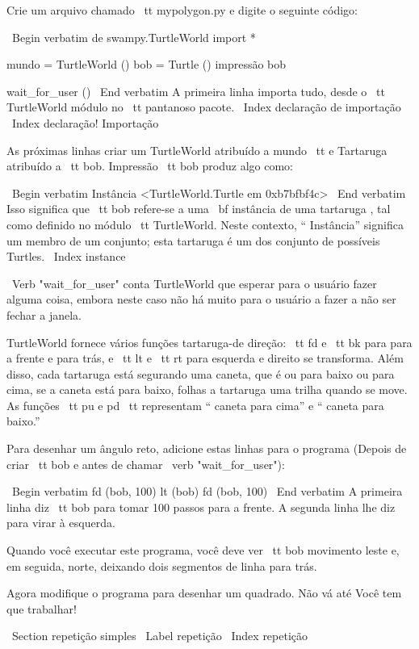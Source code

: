 \documentclass[10pt]{book}
\begin{document}
{Crie um arquivo chamado {\ tt mypolygon.py} e digite o seguinte
código:

\ Begin {verbatim}
de swampy.TurtleWorld import *

mundo = TurtleWorld ()
bob = Turtle ()
impressão bob

wait_for_user ()
\ End {verbatim}
%
A primeira linha importa tudo, desde o {\ tt TurtleWorld} módulo
no {\ tt pantanoso} pacote.
\ Index {declaração de importação}
\ Index {declaração! Importação}

As próximas linhas criar um TurtleWorld atribuído a {mundo \ tt} e
Tartaruga atribuído a {\ tt bob}. Impressão {\ tt bob} produz algo
como:

\ Begin {verbatim}
Instância <TurtleWorld.Turtle em 0xb7bfbf4c>
\ End {verbatim}
%
Isso significa que {\ tt bob} refere-se a
uma {\ bf instância} de uma tartaruga
, tal como definido no módulo {\ tt TurtleWorld}. Neste contexto,
`` Instância'' significa um membro de um conjunto;
esta tartaruga é um dos conjunto de possíveis Turtles.
\ Index {instance}

\ Verb "wait_for_user" conta TurtleWorld que esperar para o usuário
fazer alguma coisa, embora neste caso não há muito para
o usuário a fazer a não ser fechar a janela.

TurtleWorld fornece vários
funções tartaruga-de direção: {\ tt fd} e {\ tt bk} para
para a frente e para trás, e {\ tt lt} e {\ tt rt} para esquerda e
direito se transforma. Além disso, cada tartaruga está segurando uma caneta, que é
ou para baixo ou para cima, se a caneta está para baixo, folhas a tartaruga
uma trilha quando se move. As funções {\ tt pu} e {pd \ tt}
representam `` caneta para cima'' e `` caneta para baixo.''

Para desenhar um ângulo reto, adicione estas linhas para o programa
(Depois de criar {\ tt bob} e antes de chamar \ verb "wait_for_user"):

\ Begin {verbatim}
fd (bob, 100)
lt (bob)
fd (bob, 100)
\ End {verbatim}
%
A primeira linha diz {\ tt bob} para tomar 100 passos
para a frente. A segunda linha lhe diz para virar à esquerda.

Quando você executar este programa, você deve ver {\ tt bob} movimento leste e, em seguida,
norte, deixando dois segmentos de linha para trás.

Agora modifique o programa para desenhar um quadrado. Não vá até
Você tem que trabalhar!


\ Section {repetição simples}
\ Label {repetição}
\ Index {repetição}

}
\end{document}
